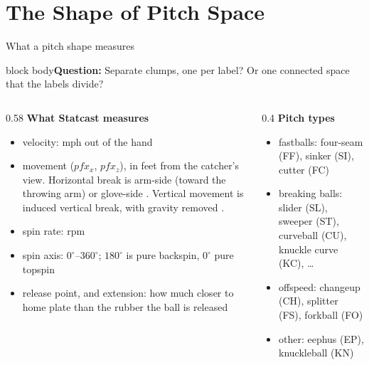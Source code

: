 \documentclass[aspectratio=169]{beamer}
\newcommand{\question}[1]{\begin{beamercolorbox}[rounded=true,sep=3pt,wd=\linewidth]{block body}\small\textcolor{MiamiRed}{\textbf{Question:}} #1\end{beamercolorbox}\vspace{2pt}}
\begin{document}
\section{The Shape of Pitch Space}
\begin{frame}{What a pitch shape measures}
\question{Separate clumps, one per label? Or one connected space that the labels divide?}
\begin{columns}[T]
\begin{column}{0.58\textwidth}
\textbf{What Statcast measures} \parencite{savantcsvdocs}
\begin{itemize}\footnotesize
  \item \alert{velocity}: mph out of the hand
  \item \alert{movement} ($pfx_x$, $pfx_z$), in feet from the catcher's view. Horizontal break is \alert{arm-side} (toward the throwing arm) or \alert{glove-side} \parencite{mlbglossary_slurve}. Vertical movement is \alert{induced vertical break}, with gravity removed \parencite{mlbglossary_ivb}.
  \item \alert{spin rate}: rpm \parencite{mlbglossary_spinrate}
  \item \alert{spin axis}: $0^\circ$--$360^\circ$; $180^\circ$ is pure backspin, $0^\circ$ pure topspin
  \item \alert{release point}, and \alert{extension}: how much closer to home plate than the rubber the ball is released \parencite{mlbglossary_extension}
\end{itemize}
\end{column}
\begin{column}{0.4\textwidth}
\textbf{Pitch types} \parencite{mlbglossary_pitchtypes}
\begin{itemize}\small
  \item fastballs: four-seam (FF), sinker (SI), cutter (FC)
  \item breaking balls: slider (SL), sweeper (ST), curveball (CU), knuckle curve (KC), \ldots
  \item offspeed: changeup (CH), splitter (FS), forkball (FO)
  \item other: eephus (EP), knuckleball (KN)
\end{itemize}
\end{column}
\end{columns}
\end{frame}
\end{document}
